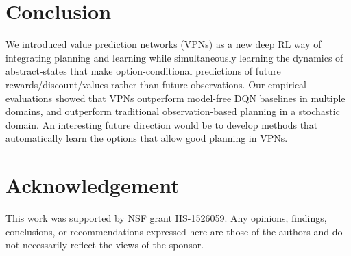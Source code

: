 \documentclass{article}
\newcommand{\cutsectionup}{\vspace*{-0.05in}}
\newcommand{\cutsectiondown}{\vspace*{-0.03in}}
\begin{document}
\cutsectionup
\section{Conclusion}
\cutsectiondown

We introduced value prediction networks (VPNs) as a new deep RL way of integrating planning and learning while simultaneously learning the dynamics of abstract-states that make option-conditional predictions of future rewards/discount/values rather than future observations. 
Our empirical evaluations showed that VPNs outperform model-free DQN baselines in multiple domains, and outperform traditional observation-based planning in a stochastic domain. 
An interesting future direction would be to develop methods that automatically learn the options that allow good planning in VPNs.

\cutsectionup
\section*{Acknowledgement} 
\cutsectiondown
This work was supported by NSF grant IIS-1526059. Any opinions, findings, conclusions, or recommendations expressed here are those of the authors and do not necessarily reflect the views of the sponsor.

\begin{comment}
Our method turned out to have several advantages over an observation-based model especially in a stochastic environment. We also demonstrated promising results on Atari games where high-level options are not available. One limitation of VPN is that each unrolling step should correspond to the actual step in the environment which makes it hard to do long-term planning at a higher-level. One interesting future work would be to combine our idea with Predictron~\cite{Silver2016ThePE} such that the agent can simulate with high-level temporal abstractions.
\end{comment}

\small


\clearpage
\appendix
\newcommand{\subfigwidth}{0.18 \linewidth} 
\end{document}
